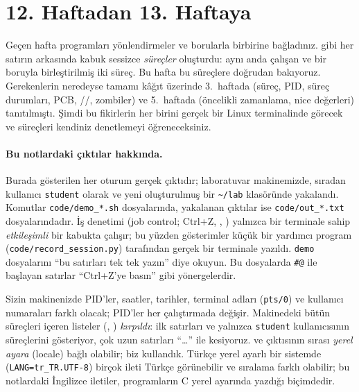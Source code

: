 \setcounter{tocdepth}{1}
\tableofcontents

\section{12. Haftadan 13. Haftaya}

Geçen hafta programları yönlendirmeler ve borularla birbirine bağladınız.  gibi her satırın arkasında kabuk sessizce \emph{süreçler} oluşturdu: aynı anda çalışan ve bir boruyla birleştirilmiş iki süreç. Bu hafta bu süreçlere doğrudan bakıyoruz. Gerekenlerin neredeyse tamamı kâğıt üzerinde 3.~haftada (süreç, PID, süreç durumları, PCB, //, zombiler) ve 5.~haftada (öncelikli zamanlama, nice değerleri) tanıtılmıştı. Şimdi bu fikirlerin her birini gerçek bir Linux terminalinde görecek ve süreçleri kendiniz denetlemeyi öğreneceksiniz.

\paragraph{Bu notlardaki çıktılar hakkında.} Burada gösterilen her oturum gerçek çıktıdır; laboratuvar makinemizde, sıradan kullanıcı \texttt{student} olarak ve yeni oluşturulmuş bir \texttt{\textasciitilde/lab} klasöründe yakalandı. Komutlar \texttt{code/demo\_*.sh} dosyalarında, yakalanan çıktılar ise \texttt{code/out\_*.txt} dosyalarındadır. İş denetimi (job control; Ctrl+Z, , ) yalnızca bir terminale sahip \emph{etkileşimli} bir kabukta çalışır; bu yüzden gösterimler küçük bir yardımcı program (\texttt{code/record\_session.py}) tarafından gerçek bir terminale yazıldı. \texttt{demo} dosyalarını ``bu satırları tek tek yazın'' diye okuyun. Bu dosyalarda \texttt{\#@} ile başlayan satırlar ``Ctrl+Z'ye basın'' gibi yönergelerdir.

Sizin makinenizde PID'ler, saatler, tarihler, terminal adları (\texttt{pts/0}) ve kullanıcı numaraları farklı olacak; PID'ler her çalıştırmada değişir. Makinedeki bütün süreçleri içeren listeler (, ) \emph{kırpıldı}: ilk satırları ve yalnızca \texttt{student} kullanıcısının süreçlerini gösteriyor, çok uzun satırları ``\dots'' ile kesiyoruz.  ve  çıktısının sırası \emph{yerel ayara} (locale) bağlı olabilir; biz  kullandık. Türkçe yerel ayarlı bir sistemde (\texttt{LANG=tr\_TR.UTF-8}) birçok ileti Türkçe görünebilir ve sıralama farklı olabilir; bu notlardaki İngilizce iletiler, programların C yerel ayarında yazdığı biçimdedir.

